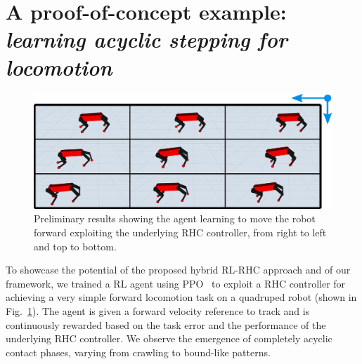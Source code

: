 \section{A proof-of-concept example: \textnormal{\textit{learning acyclic stepping for locomotion}}}
\begin{figure}[t]
	\centering
	\includegraphics[width=0.9\columnwidth]{imgs/proof_of_concept.pdf}
	\caption{Preliminary results showing the agent learning to move the robot forward exploiting the underlying RHC controller, from right to left and top to bottom.}
	\label{fig:proof}
\end{figure}
To showcase the potential of the proposed hybrid RL-RHC approach and of our framework, we trained a RL agent using PPO~\cite{rl:schulman2017proximal} to exploit a RHC controller for achieving a very simple forward locomotion task on a quadruped robot (shown in Fig.~\ref{fig:proof}). The agent is given a forward velocity reference to track and is continuously rewarded based on the task error and the performance of the underlying RHC controller. We observe the emergence of completely acyclic contact phases, varying from crawling to bound-like patterns.
 